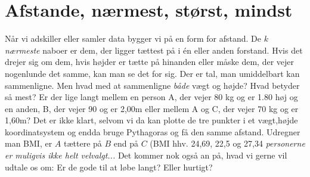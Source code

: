 \documentclass[a4paper, 12pt]{article}
\theoremstyle{remark}
\begin{document}
\section*{Afstande, nærmest, størst, mindst}
Når vi adskiller eller samler data bygger vi på en form for afstand. De $k$ \emph{ nærmeste} naboer er dem, der ligger tættest på i én eller anden forstand. Hvis det drejer sig om dem, hvis højder er tætte på hinanden eller måske dem, der vejer nogenlunde det samme, kan man se det for sig. Der er tal, man umiddelbart kan sammenligne. Men hvad med at sammenligne \emph{både} vægt og højde? Hvad betyder så mest? Er der lige langt mellem en person A, der vejer 80 kg og er 1.80 høj og en anden, B,  der vejer 90 og er 2,00m eller mellem A og C, der vejer 70 kg og er 1,60m? Det er ikke klart, selvom vi da kan plotte de tre punkter i et vægt,højde koordinatsystem og endda bruge Pythagoras og få den samme afstand. Udregner man BMI, er $A$ tættere på $B$ end på $C$ (BMI hhv. 24,69, 22,5 og  27,34   \emph{personerne er muligvis ikke helt velvalgt...}
Det kommer nok også an på, hvad vi gerne vil udtale os om: Er de gode til at løbe langt? Eller hurtigt? 
\end{document}
